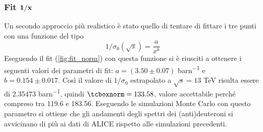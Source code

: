 \subsubsection{Fit ${\bf 1/x}$}
Un secondo approccio più realistico è stato quello di tentare di fittare i tre punti con una funzione del tipo
\begin{equation}
    1/\sigma_0\left(\sqrt s\right) = \dfrac{a}{x^b}
\end{equation}
Eseguendo il fit (\autoref{fig:fit_norm}) con questa funzione si è riusciti a ottenere i seguenti valori dei parametri di fit: $a = (3.50 \pm 0.07)$ \si{barn^{-1}} e $b = 0.154 \pm 0.017$.
Così il valore di $1/\sigma_0$ estrapolato a $\sqrt s = 13$ TeV risulta essere di $2.35473$ \si{barn^{-1}}, quindi $\ttbox{norm} = 133.58$, valore accettabile perché compreso tra 119.6 e 183.56.
Eseguendo le simulazioni Monte Carlo con questo parametro si ottiene che gli andamenti degli spettri dei (anti)deuteroni si avvicinano di più ai dati di ALICE rispetto alle simulazioni precedenti.
